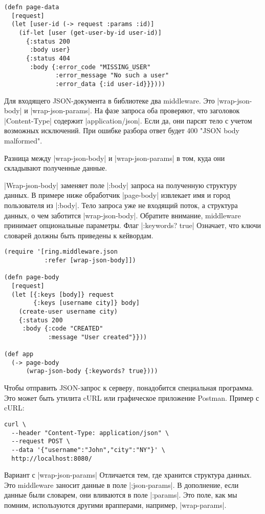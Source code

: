 \begin{verbatim}
(defn page-data
  [request]
  (let [user-id (-> request :params :id)]
    (if-let [user (get-user-by-id user-id)]
      {:status 200
       :body user}
      {:status 404
       :body {:error_code "MISSING_USER"
              :error_message "No such a user"
              :error_data {:id user-id}}})))
\end{verbatim}

Для входящего JSON-документа в библиотеке два middleware. Это \spverb|wrap-json-body| и
\spverb|wrap-json-params|. На фазе запроса оба проверяют, что заголовок \spverb|Content-Type|
содержит \spverb|application/json|. Если да, они парсят тело с учетом возможных
исключений. При ошибке разбора ответ будет 400 "JSON body malformed".

Разница между \spverb|wrap-json-body| и \spverb|wrap-json-params| в том, куда они складывают
полученные данные.

\spverb|Wrap-json-body| заменяет поле \spverb|:body| запроса на полученную структуру данных. В
примере ниже обработчик \spverb|page-body| извлекает имя и город пользователя из
\spverb|:body|. Тело запроса уже не входящий поток, а структура данных, о чем заботится
\spverb|wrap-json-body|. Обратите внимание, middleware принимает опциональные
параметры. Флаг \spverb|:keywords? true| Означает, что ключи словарей должны быть
приведены к кейвордам.

\begin{verbatim}
(require '[ring.middleware.json
           :refer [wrap-json-body]])

(defn page-body
  [request]
  (let [{:keys [body]} request
        {:keys [username city]} body]
    (create-user username city)
    {:status 200
     :body {:code "CREATED"
            :message "User created"}}))

(def app
  (-> page-body
      (wrap-json-body {:keywords? true})))
\end{verbatim}

Чтобы отправить JSON-запрос к серверу, понадобится специальная программа. Это
может быть утилита cURL или графическое приложение Postman. Пример с cURL:

\begin{verbatim}
curl \
  --header "Content-Type: application/json" \
  --request POST \
  --data '{"username":"John","city":"NY"}' \
  http://localhost:8080/
\end{verbatim}

Вариант с \spverb|wrap-json-params| Отличается тем, где хранится структура данных. Это
middleware заносит данные в поле \spverb|:json-params|. В дополнение, если данные были
словарем, они вливаются в поле \spverb|:params|. Это поле, как мы помним, используются
другими врапперами, например, \spverb|wrap-params|.

